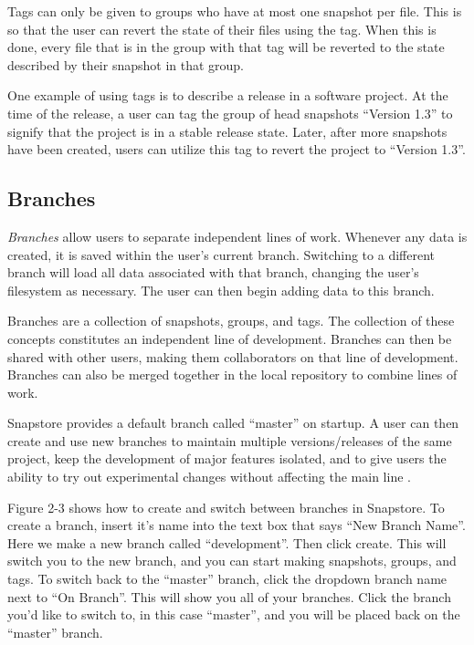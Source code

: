 Tags can only be given to groups who have at most one snapshot per file. This is so that the user can revert the state of their files using the tag. When this is done, every file that is in the group with that tag will be reverted to the state described by their snapshot in that group.

One example of using tags is to describe a release in a software project. At the time of the release, a user can tag the group of head snapshots ``Version 1.3'' to signify that the project is in a stable release state. Later, after more snapshots have been created, users can utilize this tag to revert the project to ``Version 1.3''.

\subsection{Branches}

\textit{Branches} allow users to separate independent lines of work. Whenever any data is created, it is saved within the user's current branch. Switching to a different branch will load all data associated with that branch, changing the user's filesystem as necessary. The user can then begin adding data to this branch.

Branches are a collection of snapshots, groups, and tags. The collection of these concepts constitutes an independent line of development. Branches can then be shared with other users, making them collaborators on that line of development. Branches can also be merged together in the local repository to combine lines of work.

Snapstore provides a default branch called ``master'' on startup. A user can then create and use new branches to maintain multiple versions/releases of the same project, keep the development of major features isolated, and to give users the ability to try out experimental changes without affecting the main line \cite{RossoJackson}.

Figure 2-3 shows how to create and switch between branches in Snapstore. To create a branch, insert it's name into the text box that says ``New Branch Name''. Here we make a new branch called ``development''. Then click create. This will switch you to the new branch, and you can start making snapshots, groups, and tags. To switch back to the ``master'' branch, click the dropdown branch name next to ``On Branch''. This will show you all of your branches. Click the branch you'd like to switch to, in this case ``master'', and you will be placed back on the ``master'' branch.

